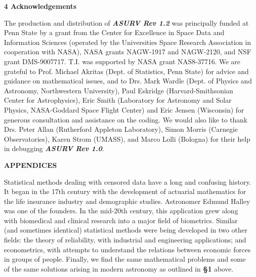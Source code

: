 \newpage

\centerline{\Large\bf 4  Acknowledgements}
 
     The production and distribution of {\sl\bf ASURV Rev 1.2} was 
principally funded at Penn State by 
a grant from the Center for Excellence in Space Data and Information
Sciences (operated by the Universities Space Research Association in
cooperation with NASA), NASA grants NAGW-1917 and NAGW-2120, and
NSF grant DMS-9007717. T.I. was supported by NASA grant NAS8-37716.
We are grateful to Prof. Michael Akritas (Dept. of Statistics, Penn 
State) for advice and guidance on mathematical issues, and
to Drs. Mark Wardle (Dept. of Physics and Astronomy, Northwestern
University), Paul Eskridge (Harvard-Smithsonian Center for Astrophysics),
Eric Smith (Laboratory for Astronomy and Solar Physics, NASA-Goddard
Space Flight Center) and Eric Jensen (Wisconsin)
for generous consultation and assistance on the coding.
We would also like to thank Drs. Peter Allan (Rutherford Appleton Laboratory),
Simon Morris (Carnegie Observatories), Karen Strom (UMASS), and Marco
Lolli (Bologna) for their help in debugging {\sl\bf ASURV Rev 1.0}.

\newpage

\bigskip
\centerline{\Large\bf APPENDICES}

\bigskip
\bigskip
{}
  
     Statistical methods dealing with censored data have a long and
confusing history.  It began in the 17th century with the development of
actuarial mathematics for the life insurance industry and demographic 
studies.  Astronomer Edmund Halley was one of the founders. In the
mid-20th century, this application grew along with biomedical and clinical
research into a major field of biometrics. Similar (and sometimes 
identical) statistical methods were  being developed in two other fields:
the theory of reliability, with industrial and engineering applications; 
and econometrics, with attempts to understand the relations between
economic forces in groups of people. Finally, we find the same mathematical
problems and some of the same solutions arising in modern astronomy as
outlined in {\bf \S 1} above.
 
